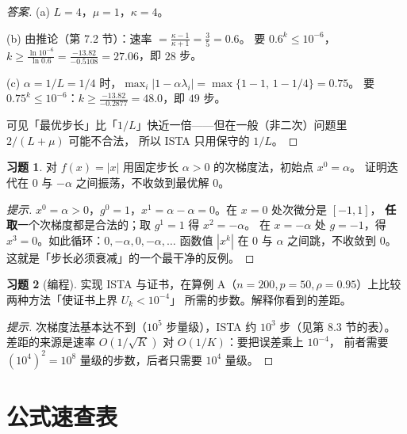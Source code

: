 \documentclass[11pt,a4paper,UTF8]{ctexart}
\theoremstyle{plain}
\theoremstyle{definition}
\newtheorem{exercise}{习题}[section]
\theoremstyle{remark}
\newcommand{\abs}[1]{\left\lvert #1 \right\rvert}
\begin{document}
\begin{proof}[答案]
(a) $L=4$，$\mu=1$，$\kappa=4$。

(b) 由推论（第 7.2 节）：速率 $=\frac{\kappa-1}{\kappa+1}=\frac35=0.6$。
要 $0.6^k\le10^{-6}$，$k\ge\frac{\ln10^{-6}}{\ln0.6}=\frac{-13.82}{-0.5108}=27.06$，即 $28$ 步。

(c) $\alpha=1/L=1/4$ 时，$\max_i\abs{1-\alpha\lambda_i}=\max\{1-1,\,1-1/4\}=0.75$。
要 $0.75^k\le10^{-6}$：$k\ge\frac{-13.82}{-0.2877}=48.0$，即 $49$ 步。

可见「最优步长」比「$1/L$」快近一倍——但在一般（非二次）问题里 $2/(L+\mu)$ 可能不合法，
所以 ISTA 只用保守的 $1/L$。
\end{proof}

\begin{exercise}
对 $f(x)=\abs x$ 用固定步长 $\alpha>0$ 的次梯度法，初始点 $x^0=\alpha$。
证明迭代在 $0$ 与 $-\alpha$ 之间振荡，不收敛到最优解 $0$。
\end{exercise}

\begin{proof}[提示]
$x^0=\alpha>0$，$g^0=1$，$x^1=\alpha-\alpha=0$。在 $x=0$ 处次微分是 $[-1,1]$，
\textbf{任取}一个次梯度都是合法的；取 $g^1=1$ 得 $x^2=-\alpha$。
在 $x=-\alpha$ 处 $g=-1$，得 $x^3=0$。如此循环：$0,-\alpha,0,-\alpha,\dots$
函数值 $\abs{x^k}$ 在 $0$ 与 $\alpha$ 之间跳，不收敛到 $0$。
这就是「步长必须衰减」的一个最干净的反例。
\end{proof}

\begin{exercise}[编程]
实现 ISTA 与证书，在算例 A（$n=200,p=50,\rho=0.95$）上比较两种方法「使证书上界 $U_k<10^{-4}$」
所需的步数。解释你看到的差距。
\end{exercise}

\begin{proof}[提示]
次梯度法基本达不到（$10^5$ 步量级），ISTA 约 $10^3$ 步（见第 8.3 节的表）。
差距的来源是速率 $O(1/\sqrt K)$ 对 $O(1/K)$：要把误差乘上 $10^{-4}$，
前者需要 $(10^4)^2=10^8$ 量级的步数，后者只需要 $10^4$ 量级。
\end{proof}

\appendix
\section{公式速查表}
\end{document}
